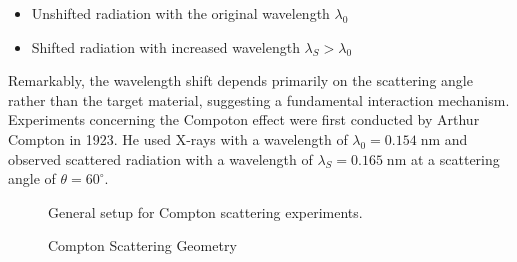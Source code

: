 \documentclass[
  a4paper,
]{book}
\providecommand{\tightlist}{%
  \setlength{\itemsep}{0pt}\setlength{\parskip}{0pt}}
\begin{document}
\begin{itemize}
\tightlist
\item
  Unshifted radiation with the original wavelength \(\lambda_0\)
\item
  Shifted radiation with increased wavelength \(\lambda_S > \lambda_0\)
\end{itemize}

Remarkably, the wavelength shift depends primarily on the scattering
angle rather than the target material, suggesting a fundamental
interaction mechanism. Experiments concerning the Compoton effect were
first conducted by Arthur Compton in 1923. He used X-rays with a
wavelength of \(\lambda_0 = 0.154 \; \mathrm{nm}\) and observed
scattered radiation with a wavelength of
\(\lambda_S = 0.165 \; \mathrm{nm}\) at a scattering angle of
\(\theta = 60^\circ\).

\begin{figure}


\caption{\label{fig-compton_exp}General setup for Compton scattering
experiments.}

\end{figure}%

\begin{figure}


\caption{\label{fig-compton_geometry}Compton Scattering Geometry}

\end{figure}%
\end{document}

